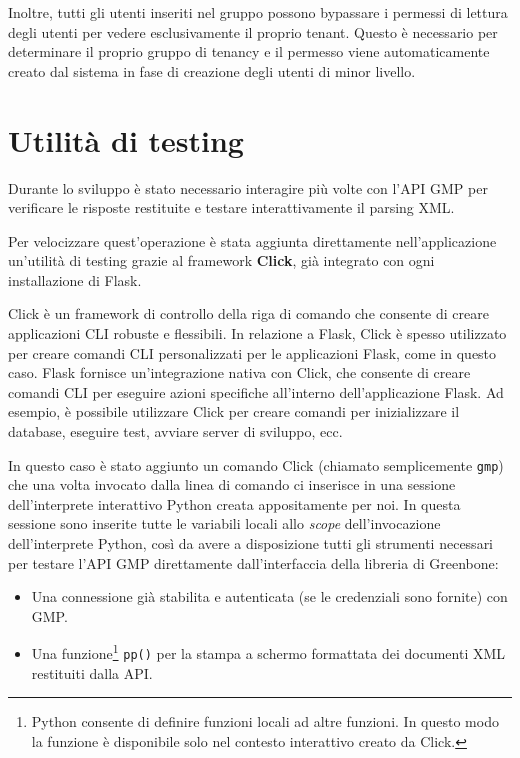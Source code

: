 Inoltre, tutti gli utenti inseriti nel gruppo possono bypassare i permessi di lettura degli utenti per vedere esclusivamente il proprio tenant. Questo è necessario per determinare il proprio gruppo di tenancy e il permesso viene automaticamente creato dal sistema in fase di creazione degli utenti di minor livello.

\section{Utilità di testing}
Durante lo sviluppo è stato necessario interagire più volte con l'API GMP per verificare le risposte restituite e testare interattivamente il parsing XML.

Per velocizzare quest'operazione è stata aggiunta direttamente nell'applicazione  un'utilità di testing grazie al framework \textbf{Click}, già integrato con ogni installazione di Flask.

Click è un framework di controllo della riga di comando che consente di creare applicazioni CLI robuste e flessibili. In relazione a Flask, Click è spesso utilizzato per creare comandi CLI personalizzati per le applicazioni Flask, come in questo caso.
Flask fornisce un'integrazione nativa con Click, che consente di creare comandi CLI per eseguire azioni specifiche all'interno dell'applicazione Flask. Ad esempio, è possibile utilizzare Click per creare comandi per inizializzare il database, eseguire test, avviare server di sviluppo, ecc.

In questo caso è stato aggiunto un comando Click (chiamato semplicemente \texttt{gmp}) che una volta invocato dalla linea di comando ci inserisce in una sessione dell'interprete interattivo Python creata appositamente per noi. In questa sessione sono inserite tutte le variabili locali allo \emph{scope} dell'invocazione dell'interprete Python, così da avere a disposizione tutti gli strumenti necessari per testare l'API GMP direttamente dall'interfaccia della libreria di Greenbone:
\begin{itemize}
    \item Una connessione già stabilita e autenticata (se le credenziali sono fornite) con GMP.
    \item Una funzione\footnote{Python consente di definire funzioni locali ad altre funzioni. In questo modo la funzione è disponibile solo nel contesto interattivo creato da Click.} \texttt{pp()} per la stampa a schermo formattata dei documenti XML restituiti dalla API.
\end{itemize}